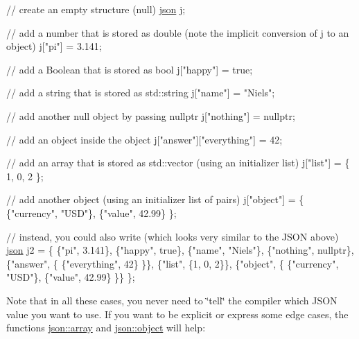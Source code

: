 \begin{DoxyCode}
\textcolor{comment}{// create an empty structure (null)}
\hyperlink{classnlohmann_1_1basic__json}{json} j;

\textcolor{comment}{// add a number that is stored as double (note the implicit conversion of j to an object)}
j[\textcolor{stringliteral}{"pi"}] = 3.141;

\textcolor{comment}{// add a Boolean that is stored as bool}
j[\textcolor{stringliteral}{"happy"}] = \textcolor{keyword}{true};

\textcolor{comment}{// add a string that is stored as std::string}
j[\textcolor{stringliteral}{"name"}] = \textcolor{stringliteral}{"Niels"};

\textcolor{comment}{// add another null object by passing nullptr}
j[\textcolor{stringliteral}{"nothing"}] = \textcolor{keyword}{nullptr};

\textcolor{comment}{// add an object inside the object}
j[\textcolor{stringliteral}{"answer"}][\textcolor{stringliteral}{"everything"}] = 42;

\textcolor{comment}{// add an array that is stored as std::vector (using an initializer list)}
j[\textcolor{stringliteral}{"list"}] = \{ 1, 0, 2 \};

\textcolor{comment}{// add another object (using an initializer list of pairs)}
j[\textcolor{stringliteral}{"object"}] = \{ \{\textcolor{stringliteral}{"currency"}, \textcolor{stringliteral}{"USD"}\}, \{\textcolor{stringliteral}{"value"}, 42.99\} \};

\textcolor{comment}{// instead, you could also write (which looks very similar to the JSON above)}
\hyperlink{classnlohmann_1_1basic__json}{json} j2 = \{
  \{\textcolor{stringliteral}{"pi"}, 3.141\},
  \{\textcolor{stringliteral}{"happy"}, \textcolor{keyword}{true}\},
  \{\textcolor{stringliteral}{"name"}, \textcolor{stringliteral}{"Niels"}\},
  \{\textcolor{stringliteral}{"nothing"}, \textcolor{keyword}{nullptr}\},
  \{\textcolor{stringliteral}{"answer"}, \{
    \{\textcolor{stringliteral}{"everything"}, 42\}
  \}\},
  \{\textcolor{stringliteral}{"list"}, \{1, 0, 2\}\},
  \{\textcolor{stringliteral}{"object"}, \{
    \{\textcolor{stringliteral}{"currency"}, \textcolor{stringliteral}{"USD"}\},
    \{\textcolor{stringliteral}{"value"}, 42.99\}
  \}\}
\};
\end{DoxyCode}


Note that in all these cases, you never need to \char`\"{}tell\char`\"{} the compiler which J\+S\+ON value you want to use. If you want to be explicit or express some edge cases, the functions {\ttfamily \hyperlink{classnlohmann_1_1basic__json_aa80485befaffcadaa39965494e0b4d2e}{json\+::array}} and {\ttfamily \hyperlink{classnlohmann_1_1basic__json_aa13f7c0615867542ce80337cbcf13ada}{json\+::object}} will help\+:


